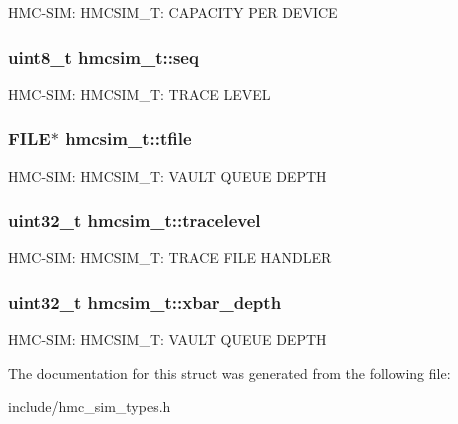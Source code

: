 H\-M\-C-\/\-S\-I\-M\-: H\-M\-C\-S\-I\-M\-\_\-\-T\-: C\-A\-P\-A\-C\-I\-T\-Y P\-E\-R D\-E\-V\-I\-C\-E \hypertarget{structhmcsim__t_a88d9cee2bbc19b8d4b650a9562090366}{
\subsubsection[{seq}]{\setlength{\rightskip}{0pt plus 5cm}uint8\-\_\-t hmcsim\-\_\-t\-::seq}}\label{structhmcsim__t_a88d9cee2bbc19b8d4b650a9562090366}
H\-M\-C-\/\-S\-I\-M\-: H\-M\-C\-S\-I\-M\-\_\-\-T\-: T\-R\-A\-C\-E L\-E\-V\-E\-L \hypertarget{structhmcsim__t_a95541b8744b316387f4eaa026f405e97}{
\subsubsection[{tfile}]{\setlength{\rightskip}{0pt plus 5cm}F\-I\-L\-E$\ast$ hmcsim\-\_\-t\-::tfile}}\label{structhmcsim__t_a95541b8744b316387f4eaa026f405e97}
H\-M\-C-\/\-S\-I\-M\-: H\-M\-C\-S\-I\-M\-\_\-\-T\-: V\-A\-U\-L\-T Q\-U\-E\-U\-E D\-E\-P\-T\-H \hypertarget{structhmcsim__t_a538d618819d1aea568265c4573673265}{
\subsubsection[{tracelevel}]{\setlength{\rightskip}{0pt plus 5cm}uint32\-\_\-t hmcsim\-\_\-t\-::tracelevel}}\label{structhmcsim__t_a538d618819d1aea568265c4573673265}
H\-M\-C-\/\-S\-I\-M\-: H\-M\-C\-S\-I\-M\-\_\-\-T\-: T\-R\-A\-C\-E F\-I\-L\-E H\-A\-N\-D\-L\-E\-R \hypertarget{structhmcsim__t_a9ee666483d49753bf9432eb42fab73eb}{
\subsubsection[{xbar\-\_\-depth}]{\setlength{\rightskip}{0pt plus 5cm}uint32\-\_\-t hmcsim\-\_\-t\-::xbar\-\_\-depth}}\label{structhmcsim__t_a9ee666483d49753bf9432eb42fab73eb}
H\-M\-C-\/\-S\-I\-M\-: H\-M\-C\-S\-I\-M\-\_\-\-T\-: V\-A\-U\-L\-T Q\-U\-E\-U\-E D\-E\-P\-T\-H 

The documentation for this struct was generated from the following file\-:\begin{DoxyCompactItemize}
\item 
include/hmc\-\_\-sim\-\_\-types.\-h\end{DoxyCompactItemize}
